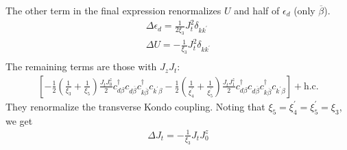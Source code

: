 \documentclass[twoside,11pt]{report}
\numberwithin{equation}{section}
\begin{document}
The other term in the final expression renormalizes \(U\) and half of \(\epsilon_d\) (only \(\overline\beta\)).
\begin{equation}\begin{aligned}
	\label{edU3}
	\Delta \epsilon_d = \frac{1}{2\xi_3}J_t^2 \delta_{kk^\prime}\\
	\Delta U = -\frac{1}{\xi_3}J_t^2\delta_{kk^\prime}\\
\end{aligned}\end{equation}
The remaining terms are those with \(J_z J_t\):
\begin{equation}\begin{aligned}
	\left[-\frac{1}{2}\left(\frac{1}{\xi_3} + \frac{1}{\xi_5}\right)\frac{J_t J^z_0}{2}c^\dagger_{d\beta}c_{d\overline\beta}c^\dagger_{k\overline\beta}c_{k^\prime\beta}-\frac{1}{2}\left(\frac{1}{\xi^\prime_4} + \frac{1}{\xi^\prime_5}\right)\frac{J_t J^z_1}{2}c^\dagger_{d\beta}c_{d\overline\beta}c^\dagger_{k\overline\beta}c_{k^\prime\beta}\right] + \text{h.c.}
\end{aligned}\end{equation}
They renormalize the transverse Kondo coupling. Noting that \(\xi_5 = \xi_4^\prime = \xi_5^\prime = \xi_3\), we get
\begin{equation}\begin{aligned}
	\label{Jt}
	\Delta J_t = -\frac{1}{\xi_3}J_t J^z_0
\end{aligned}\end{equation}
\end{document}
